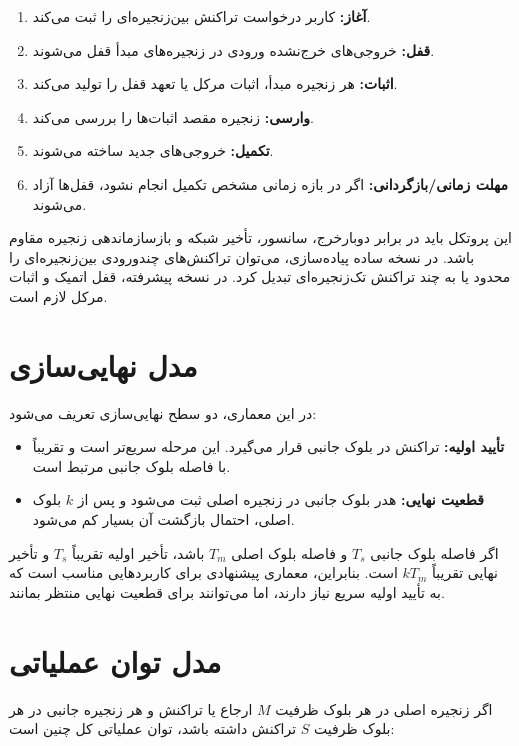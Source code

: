 \begin{enumerate}
\item \textbf{آغاز:} کاربر درخواست تراکنش بین‌زنجیره‌ای را ثبت می‌کند.
\item \textbf{قفل:} خروجی‌های خرج‌نشده ورودی در زنجیره‌های مبدأ قفل می‌شوند.
\item \textbf{اثبات:} هر زنجیره مبدأ، اثبات مرکل یا تعهد قفل را تولید می‌کند.
\item \textbf{وارسی:} زنجیره مقصد اثبات‌ها را بررسی می‌کند.
\item \textbf{تکمیل:} خروجی‌های جدید ساخته می‌شوند.
\item \textbf{مهلت زمانی/بازگردانی:} اگر در بازه زمانی مشخص تکمیل انجام نشود، قفل‌ها آزاد می‌شوند.
\end{enumerate}

این پروتکل باید در برابر دوبارخرج، سانسور، تأخیر شبکه و بازسازماندهی زنجیره مقاوم باشد. در نسخه ساده پیاده‌سازی، می‌توان تراکنش‌های چندورودی بین‌زنجیره‌ای را محدود یا به چند تراکنش تک‌زنجیره‌ای تبدیل کرد. در نسخه پیشرفته، قفل اتمیک و اثبات مرکل لازم است.

\section{مدل نهایی‌سازی}

در این معماری، دو سطح نهایی‌سازی تعریف می‌شود:

\begin{itemize}
\item \textbf{تأیید اولیه:} تراکنش در بلوک جانبی قرار می‌گیرد. این مرحله سریع‌تر است و تقریباً با فاصله بلوک جانبی مرتبط است.
\item \textbf{قطعیت نهایی:} هدر بلوک جانبی در زنجیره اصلی ثبت می‌شود و پس از \(k\) بلوک اصلی، احتمال بازگشت آن بسیار کم می‌شود.
\end{itemize}

اگر فاصله بلوک جانبی \(T_s\) و فاصله بلوک اصلی \(T_m\) باشد، تأخیر اولیه تقریباً \(T_s\) و تأخیر نهایی تقریباً \(kT_m\) است. بنابراین، معماری پیشنهادی برای کاربردهایی مناسب است که به تأیید اولیه سریع نیاز دارند، اما می‌توانند برای قطعیت نهایی منتظر بمانند.

\section{مدل توان عملیاتی}

اگر زنجیره اصلی در هر بلوک ظرفیت \(M\) ارجاع یا تراکنش و هر زنجیره جانبی در هر بلوک ظرفیت \(S\) تراکنش داشته باشد، توان عملیاتی کل چنین است:

